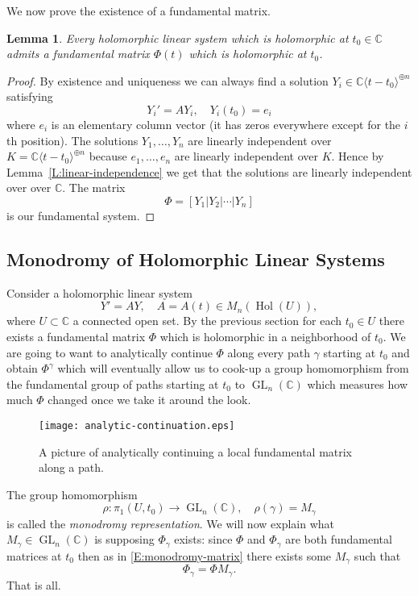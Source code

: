 \documentclass[]{book}
\numberwithin{equation}{section}
\newtheorem{lemma}[theorem]{Lemma}
\theoremstyle{definition}
\theoremstyle{remark}
\newcommand{\CC}{\mathbb{C}}
\newcommand{\hol}{\operatorname{Hol}}
\newcommand{\GL}{\operatorname{GL}}
\begin{document}
We now prove the existence of a fundamental matrix.
\begin{lemma}
	Every holomorphic linear system which is holomorphic at $t_0 \in \CC$ admits a fundamental matrix $\Phi(t)$ which is holomorphic at $t_0$.
\end{lemma}
\begin{proof}
By existence and uniqueness we can always find a solution $Y_i \in \CC\langle t-t_0 \rangle^{\oplus n}$ satisfying 
 $$ Y_i' = AY_i, \quad Y_i(t_0) = e_i $$
where $e_i$ is an elementary column vector (it has zeros everywhere except for the $i$th position).
The solutions $Y_1,\ldots,Y_n$ are linearly independent over $K=\CC\langle t-t_0 \rangle^{\oplus n}$ because $e_1,\ldots,e_n$ are linearly independent over $K$. 
Hence by Lemma~\ref{L:linear-independence} we get that the solutions are linearly independent over over $\CC$.
 The matrix $$\Phi = [Y_1 \vert Y_2 \vert \cdots \vert Y_n ]$$ 
 is our fundamental system.
 \end{proof}

\subsection{Monodromy of Holomorphic Linear Systems}

Consider a holomorphic linear system 
$$Y'=AY, \quad A=A(t) \in M_n(\hol(U)),$$ 
where $U\subset \CC$ a connected open set. 
By the previous section for each $t_0 \in U$ there exists a fundamental matrix $\Phi$ which is holomorphic in a neighborhood of $t_0$.
We are going to want to analytically continue $\Phi$ along every path $\gamma$ starting at $t_0$ and obtain $\Phi^{\gamma}$ which will eventually allow us to cook-up a group homomorphism from the fundamental group of paths starting at $t_0$ to $\GL_n(\CC)$ which measures how much $\Phi$ changed once we take it around the look. 

\begin{figure}[h]
	\begin{center}
	\texttt{[image: analytic-continuation.eps]}
	\end{center}
\caption{A picture of analytically continuing a local fundamental matrix along a path.}
\end{figure}

The group homomorphism 
 $$ \rho: \pi_1(U,t_0) \to \GL_n(\CC), \quad \rho(\gamma) = M_{\gamma}$$
is called the \emph{monodromy representation}.
We will now explain what $M_{\gamma}\in \GL_n(\CC)$ is  supposing $\Phi_{\gamma}$ exists:
since $\Phi$ and $\Phi_{\gamma}$ are both fundamental matrices at $t_0$ then as in  \eqref{E:monodromy-matrix} there exists some $M_{\gamma}$ such that 
 $$ \Phi_{\gamma} = \Phi M_{\gamma}.$$
That is all.
\end{document}
